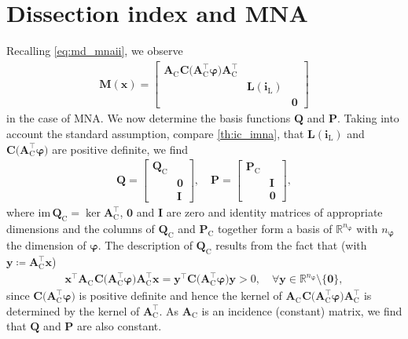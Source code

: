\documentclass[AMA,STIX1COL]{WileyNJD-v2}
\newcommand{\mb}[1]{\mathbf{#1}}
\newcommand{\mr}[1]{\mathrm{#1}}
\newcommand{\T}{{\!\top}}
\newcommand{\A}[1]{\mb{A}_\mr{#1}}
\newcommand{\AT}[1]{\mb{A}_\mr{#1}^{\T}}
\newcommand{\vphi}{\boldsymbol{\varphi}}
\renewcommand{\i}[1]{\mb{i}_\mr{#1}}
\begin{document}
\section{Dissection index and MNA}
\label{sec:dim}
\begin{remark}
    \label{re:dim_bf}
    Recalling \eqref{eq:md_mnaii}, we observe
    \begin{align*}
        \mb{M}(\mb{x}) = \begin{bmatrix}
            \A{C}^{\phantom{\T}} \mb{C} \big( \AT{C} \vphi \big) \AT{C} & &\\
            & \mb{L}(\i{L}) &\\
            & & \mb{0}
        \end{bmatrix}
    \end{align*}
    in the case of MNA. We now determine the basis functions $\mb{Q}$ and $\mb{P}$. Taking into account the standard assumption, compare \autoref{th:ic_imna}, that $\mb{L}(\i{L})$ and $\mb{C} \big( \AT{C} \vphi \big)$ are positive definite, we find\cite{jansen2014}
    \begin{align*}
        \mb{Q} = \begin{bmatrix}
            \mb{Q}_\mr{C} &\\
            & \mb{0}\\
            & \mb{I}
        \end{bmatrix}, \quad \mb{P} = \begin{bmatrix}
            \mb{P}_\mr{C} &\\
            & \mb{I}\\
            & \mb{0}
        \end{bmatrix},
    \end{align*}
    where $\mr{im\, } \mb{Q}_\mr{C} = \ker \AT{C}$, $\mb{0}$ and $\mb{I}$ are zero and identity matrices of appropriate dimensions and the columns of $\mb{Q}_\mr{C}$ and $\mb{P}_\mr{C}$ together form a basis of $\mathbb{R}^{n_{\vphi}}$ with $n_{\vphi}$ the dimension of $\vphi$. The description of $\mb{Q}_\mr{C}$ results from the fact that (with $\mb{y} \coloneqq \AT{C} \mb{x}$)
    \begin{align*}
        \mb{x}^\T \A{C}^{\phantom{\T}} \mb{C} \big( \AT{C} \vphi \big) \AT{C} \mb{x} = \mb{y}^\T \mb{C} \big( \AT{C} \vphi \big) \mb{y} > 0, \quad \forall \mb{y} \in \mathbb{R}^{n_{\vphi}} \setminus \{ \mb{0} \},
    \end{align*}
    since $\mb{C} \big( \AT{C} \vphi \big)$ is positive definite and hence the kernel of $\A{C}^{\phantom{\T}} \mb{C} \big( \AT{C} \vphi \big) \AT{C}$ is determined by the kernel of $\AT{C}$. As $\A{C}$ is an incidence (constant) matrix, we find that $\mb{Q}$ and $\mb{P}$ are also constant.
\end{remark}
\end{document}

